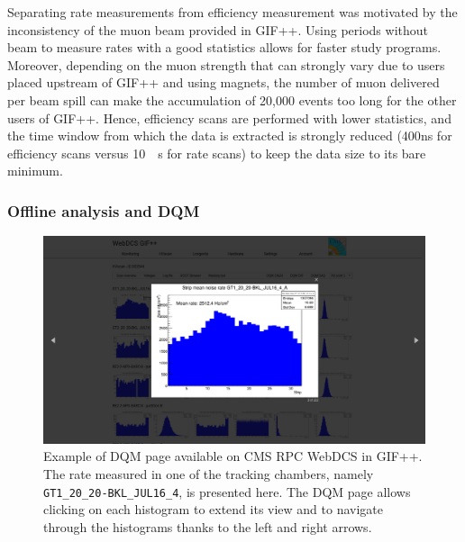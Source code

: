 	Separating rate measurements from efficiency measurement was motivated by the inconsistency of the muon beam provided in GIF++. Using periods without beam to measure rates with a good statistics allows for faster study programs. Moreover, depending on the muon strength that can strongly vary due to users placed upstream of GIF++ and using magnets, the number of muon delivered per beam spill can make the accumulation of 20,000 events too long for the other users of GIF++. Hence, efficiency scans are performed with lower statistics, and the time window from which the data is extracted is strongly reduced (\si{400}{ns} for efficiency scans versus \SI{10}{\mu s} for rate scans) to keep the data size to its bare minimum.
	
		\subsubsection{Offline analysis and \acl{DQM}}
		\label{chapt5:sssec:DQM}

	\begin{figure}[H]
        \centering
		\includegraphics[width = \linewidth]{fig/chapt5/GIFpp-DQM-DAQ.png}
		\caption{\label{fig:DQM-DAQ} Example of DQM page available on CMS RPC WebDCS in GIF++. The rate measured in one of the tracking chambers, namely \texttt{GT1\_20\_20-BKL\_JUL16\_4}, is presented here. The DQM page allows clicking on each histogram to extend its view and to navigate through the histograms thanks to the left and right arrows.}
	\end{figure}
		
